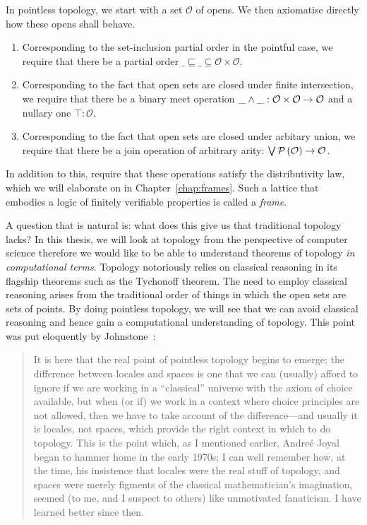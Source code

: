 In pointless topology, we start with a set $\mathcal{O}$ of opens. We then axiomatise
directly how these opens shall behave.
\begin{enumerate}
  \item Corresponding to the set-inclusion partial order in the pointful case, we require that
    there be a partial order $\_\sqsubseteq\_ \subseteq \mathcal{O} \times \mathcal{O}$.
  \item Corresponding to the fact that open sets are closed under finite intersection, we
    require that there be a binary meet operation $\meet{\_}{\_} : \mathcal{O} \times
    \mathcal{O} \rightarrow \mathcal{O}$ and a nullary one $\top : \mathcal{O}$.
  \item Corresponding to the fact that open sets are closed under arbitary union, we
    require that there be a join operation of arbitrary arity: $\joinnm{}\_ :
    \pow{\mathcal{O}} \rightarrow \mathcal{O}$.
\end{enumerate}
In addition to this, require that these operations satisfy the distributivity law, which
we will elaborate on in Chapter~\ref{chap:frames}. Such a lattice that embodies a logic
of finitely verifiable properties is called a \emph{frame}.

 A question that is natural
is: what does this give us that traditional topology lacks? In this thesis, we will look
at topology from the perspective of computer science therefore we would like to be able to
understand theorems of topology \emph{in computational terms}. Topology notoriously relies
on classical reasoning in its flagship theorems such as the Tychonoff theorem. The need to
employ classical reasoning arises from the traditional order of things in which the open
sets are sets of points. By doing pointless topology, we will see that we can avoid
classical reasoning and hence gain a computational understanding of topology. This point
was put eloquently by Johnstone~\cite[pg.~46]{stone-spaces}:
\begin{quote}
  It is here that the real point of pointless topology begins to emerge; the difference
  between locales and spaces is one that we can (usually) afford to ignore if we are
  working in a ``classical'' universe with the axiom of choice available, but when (or if)
  we work in a context where choice principles are not allowed, then we have to take
  account of the difference—and usually it is locales, not spaces, which provide the right
  context in which to do topology. This is the point which, as I mentioned earlier,
  Andre\'{e} Joyal began to hammer home in the early 1970s; I can well remember how, at
  the time, his insistence that locales were the real stuff of topology, and spaces were
  merely figments of the classical mathematician's imagination, seemed (to me, and I
  suspect to others) like unmotivated fanaticism. I have learned better since then.
\end{quote}

